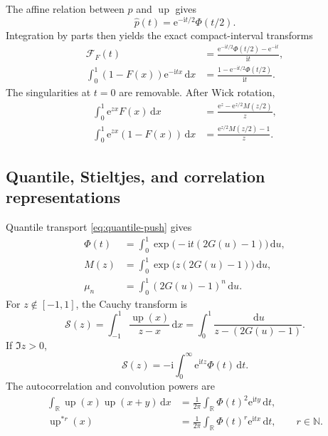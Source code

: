 \documentclass[11pt,oneside]{article}
\theoremstyle{definition}
\theoremstyle{remark}
\newcommand{\R}{\mathbb R}
\newcommand{\N}{\mathbb N}
\newcommand{\Up}{\operatorname{up}}
\newcommand{\e}{\mathrm e}
\newcommand{\ii}{\mathrm i}
\newcommand{\dd}{\,\mathrm d}
\begin{document}
The affine relation between $p$ and $\Up$ gives
\begin{equation}\label{eq:p-transform}
 \widehat p(t)=\e^{-\ii t/2}\Phi(t/2).
\end{equation}
Integration by parts then yields the exact compact-interval transforms
\begin{align}
 \mathscr F_F(t)
 &=\frac{\e^{-\ii t/2}\Phi(t/2)-\e^{-\ii t}}{\ii t},
 \label{eq:F-transform-product}\\
 \int_0^1(1-F(x))\e^{-\ii tx}\dd x
 &=\frac{1-\e^{-\ii t/2}\Phi(t/2)}{\ii t}.
 \label{eq:survival-transform-product}
\end{align}
The singularities at $t=0$ are removable.  After Wick rotation,
\begin{align}
 \int_0^1\e^{zx}F(x)\dd x
 &=\frac{\e^z-\e^{z/2}M(z/2)}{z},\label{eq:F-Laplace}\\
 \int_0^1\e^{zx}(1-F(x))\dd x
 &=\frac{\e^{z/2}M(z/2)-1}{z}.
 \label{eq:survival-Laplace}
\end{align}

\subsection{Quantile, Stieltjes, and correlation representations}

Quantile transport \eqref{eq:quantile-push} gives
\begin{align}
 \Phi(t)&=\int_0^1\exp\bigl(-\ii t(2G(u)-1)\bigr)\dd u,
 \label{eq:Phi-quantile}\\
 M(z)&=\int_0^1\exp\bigl(z(2G(u)-1)\bigr)\dd u,
 \label{eq:M-quantile}\\
 \mu_n&=\int_0^1(2G(u)-1)^n\dd u.\label{eq:moments-quantile}
\end{align}
For $z\notin[-1,1]$, the Cauchy transform is
\begin{equation}\label{eq:Cauchy-quantile}
 \mathcal S(z)=\int_{-1}^1\frac{\Up(x)}{z-x}\dd x
 =\int_0^1\frac{\dd u}{z-(2G(u)-1)}.
\end{equation}
If $\Im z>0$,
\begin{equation}\label{eq:Cauchy-Fourier}
 \mathcal S(z)=-\ii\int_0^\infty\e^{\ii tz}\Phi(t)\dd t.
\end{equation}
The autocorrelation and convolution powers are
\begin{align}
 \int_\R\Up(x)\Up(x+y)\dd x
 &=\frac1{2\pi}\int_\R\Phi(t)^2\e^{\ii ty}\dd t,
 \label{eq:autocorrelation}\\
 \Up^{*r}(x)&=\frac1{2\pi}\int_\R\Phi(t)^r\e^{\ii tx}\dd t,
 \qquad r\in\N.\label{eq:convolution-powers}
\end{align}
\end{document}
